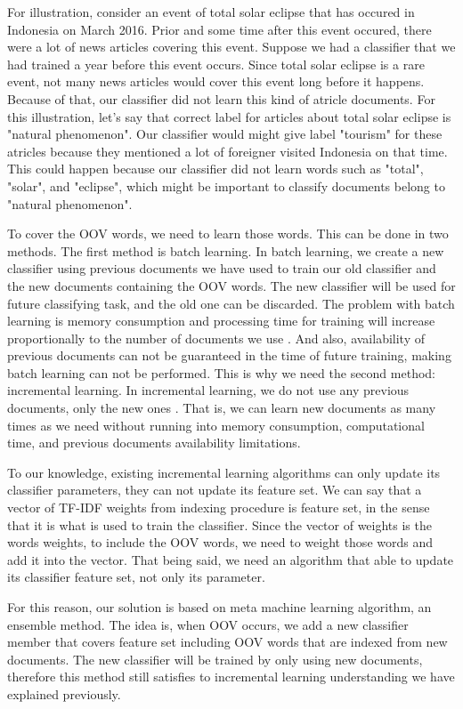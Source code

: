 \documentclass[conference]{IEEEtran}
\begin{document}
For illustration, consider an event of total solar eclipse that has occured in Indonesia on March 2016.
Prior and some time after this event occured, there were a lot of news articles covering this event.
Suppose we had a classifier that we had trained a year before this event occurs.
Since total solar eclipse is a rare event, not many news articles would cover this event long before it happens.
Because of that, our classifier did not learn this kind of atricle documents.
For this illustration, let's say that correct label for articles about total solar eclipse is "natural phenomenon".
Our classifier would might give label "tourism" for these atricles because they mentioned a lot of foreigner visited Indonesia on that time.
This could happen because our classifier did not learn words such as "total", "solar", and "eclipse", which might be important to classify documents belong to "natural phenomenon".

To cover the OOV words, we need to learn those words.
This can be done in two methods.
The first method is batch learning.
In batch learning, we create a new classifier using previous documents we have used to train our old classifier and the new documents containing the OOV words.
The new classifier will be used for future classifying task, and the old one can be discarded.
The problem with batch learning is memory consumption and processing time for training will increase proportionally to the number of documents we use \cite{calandra}.
And also, availability of previous documents can not be guaranteed in the time of future training, making batch learning can not be performed.
This is why we need the second method: incremental learning.
In incremental learning, we do not use any previous documents, only the new ones \cite{muhlbaier}.
That is, we can learn new documents as many times as we need without running into memory consumption, computational time, and previous documents availability limitations.

To our knowledge, existing incremental learning algorithms can only update its classifier parameters, they can not update its feature set.
We can say that a vector of TF-IDF weights from indexing procedure is feature set, in the sense that it is what is used to train the classifier.
Since the vector of weights is the words weights, to include the OOV words, we need to weight those words and add it into the vector.
That being said, we need an algorithm that able to update its classifier feature set, not only its parameter.

For this reason, our solution is based on meta machine learning algorithm, an ensemble method.
The idea is, when OOV occurs, we add a new classifier member that covers feature set including OOV words that are indexed from new documents.
The new classifier will be trained by only using new documents, therefore this method still satisfies to incremental learning understanding we have explained previously.
\end{document}
